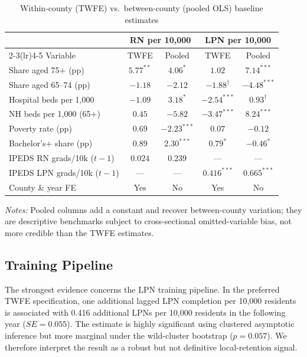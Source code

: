 \documentclass[12pt]{article}
\begin{document}
\begin{table}[!htbp]
\centering
\caption{Within-county (TWFE) vs.\ between-county (pooled OLS) baseline estimates}
\label{tab:pooled}
\small
\begin{tabular}{lcccc}
\toprule
 & \multicolumn{2}{c}{RN per 10{,}000} & \multicolumn{2}{c}{LPN per 10{,}000} \\
\cmidrule(lr){2-3}\cmidrule(lr){4-5}
Variable & TWFE & Pooled & TWFE & Pooled \\
\midrule
Share aged 75$+$ (pp) & $5.77^{**}$ & $4.06^{*}$ & $1.02$ & $7.14^{***}$ \\
Share aged 65--74 (pp) & $-1.18$ & $-2.12$ & $-1.88^{\dagger}$ & $-4.48^{***}$ \\
Hospital beds per 1{,}000 & $-1.09$ & $3.18^{*}$ & $-2.54^{***}$ & $0.93^{\dagger}$ \\
NH beds per 1{,}000 (65$+$) & $0.45$ & $-5.82$ & $-3.47^{***}$ & $8.24^{***}$ \\
Poverty rate (pp) & $0.69$ & $-2.23^{***}$ & $0.07$ & $-0.12$ \\
Bachelor's$+$ share (pp) & $0.89$ & $2.30^{***}$ & $0.79^{*}$ & $-0.46^{*}$ \\
IPEDS RN grads/10k ($t-1$) & $0.024$ & $0.239$ & --- & --- \\
IPEDS LPN grads/10k ($t-1$) & --- & --- & $0.416^{***}$ & $0.665^{***}$ \\
\midrule
County \& year FE & Yes & No & Yes & No \\
\bottomrule
\end{tabular}
\par\medskip\footnotesize\textit{Notes:} Pooled columns add a constant and recover between-county variation; they are descriptive benchmarks subject to cross-sectional omitted-variable bias, not more credible than the TWFE estimates.
\end{table}

\subsection{Training Pipeline}

The strongest evidence concerns the LPN training pipeline. In the preferred
TWFE specification, one additional lagged LPN completion per 10{,}000
residents is associated with 0.416 additional LPNs per 10{,}000 residents
in the following year ($SE=0.055$). The estimate is highly significant
using clustered asymptotic inference but more marginal under the
wild-cluster bootstrap ($p=0.057$). We therefore interpret the result as a
robust but not definitive local-retention signal.
\end{document}
